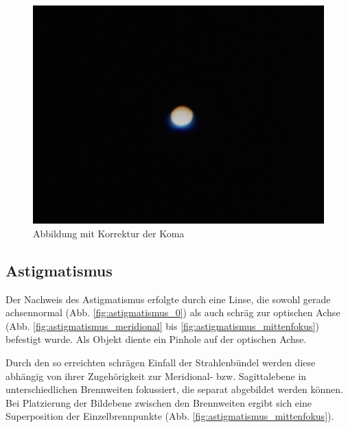 \begin{figure}[h!]
\begin{minipage}[t]{0.32\textwidth}
		\includegraphics[width=\linewidth]{img/Koma/Prakt_Linsenfehler_2015_06_04_099}
		\caption{Abbildung mit Korrektur der Koma}
		\label{fig:koma_korrigiert}
	\end{minipage}	
\end{figure}

\subsection{Astigmatismus}

Der Nachweis des Astigmatismus erfolgte durch eine Linse, die sowohl gerade achsennormal (Abb. \ref{fig:astigmatismus_0}) als auch schräg zur optischen Achse (Abb. \ref{fig:astigmatismus_meridional} bis \ref{fig:astigmatismus_mittenfokus}) befestigt wurde. Als Objekt diente ein Pinhole auf der optischen Achse. 

Durch den so erreichten schrägen Einfall der Strahlenbündel werden diese abhängig von ihrer Zugehörigkeit zur Meridional- bzw. Sagittalebene in unterschiedlichen Brennweiten fokussiert, die separat abgebildet werden können. Bei Platzierung der Bildebene zwischen den Brennweiten ergibt sich eine Superposition der Einzelbrennpunkte (Abb. \ref{fig:astigmatismus_mittenfokus}).

